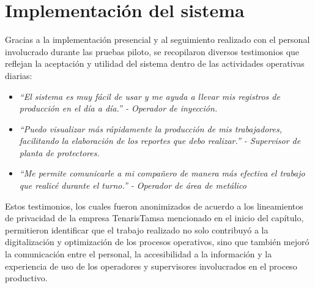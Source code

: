 \section{Implementación del sistema}

Gracias a la implementación presencial y al seguimiento realizado con el personal involucrado durante las pruebas piloto, se recopilaron diversos testimonios que reflejan la aceptación y utilidad del sistema dentro de las actividades operativas diarias:

\begin{itemize}

    \item \textit{\enquote{El sistema es muy fácil de usar y me ayuda a llevar mis registros de producción en el día a día.} - Operador de inyección.}

    \item \textit{\enquote{Puedo visualizar más rápidamente la producción de mis trabajadores, facilitando la elaboración de los reportes que debo realizar.} - Supervisor de planta de protectores.}

    \item \textit{\enquote{Me permite comunicarle a mi compañero de manera más efectiva el trabajo que realicé durante el turno.} - Operador de área de metálico}

\end{itemize}

Estos testimonios, los cuales fueron anonimizados de acuerdo a los lineamientos de privacidad de la empresa TenarisTamsa mencionado en el inicio del capítulo, permitieron identificar que el trabajo realizado no solo contribuyó a la digitalización y optimización de los procesos operativos, sino que también mejoró la comunicación entre el personal, la accesibilidad a la información y la experiencia de uso de los operadores y supervisores involucrados en el proceso productivo.

